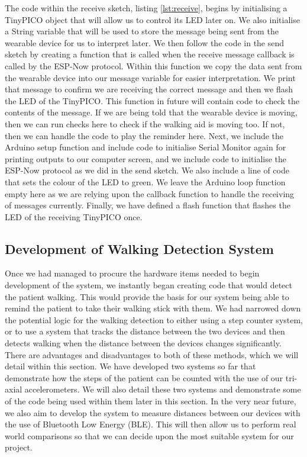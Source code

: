 {The code within the receive sketch, listing \ref{lst:receive}, begins by initialising a TinyPICO object that will allow us to control its LED later on. We also initialise a String variable that will be used to store the message being sent from the wearable device for us to interpret later. We then follow the code in the send sketch by creating a function that is called when the receive message callback is called by the ESP-Now protocol. Within this function we copy the data sent from the wearable device into our message variable for easier interpretation. We print that message to confirm we are receiving the correct message and then we flash the LED of the TinyPICO. This function in future will contain code to check the contents of the message. If we are being told that the wearable device is moving, then we can run checks here to check if the walking aid is moving too. If not, then we can handle the code to play the reminder here. Next, we include the Arduino setup function and include code to initialise Serial Monitor again for printing outputs to our computer screen, and we include code to initialise the ESP-Now protocol as we did in the send sketch. We also include a line of code that sets the colour of the LED to green. We leave the Arduino loop function empty here as we are relying upon the callback function to handle the receiving of messages currently. Finally, we have defined a flash function that flashes the LED of the receiving TinyPICO once.

\subsection{Development of Walking Detection System}

Once we had managed to procure the hardware items needed to begin development of the system, we instantly began creating code that would detect the patient walking. This would provide the basis for our system being able to remind the patient to take their walking stick with them. We had narrowed down the potential logic for the walking detection to either using a step counter system, or to use a system that tracks the distance between the two devices and then detects walking when the distance between the devices changes significantly. There are advantages and disadvantages to both of these methods, which we will detail within this section. We have developed two systems so far that demonstrate how the steps of the patient can be counted with the use of our tri-axial accelerometers. We will also detail these two systems and demonstrate some of the code being used within them later in this section. In the very near future, we also aim to develop the system to measure distances between our devices with the use of Bluetooth Low Energy (BLE). This will then allow us to perform real world comparisons so that we can decide upon the most suitable system for our project.

}
